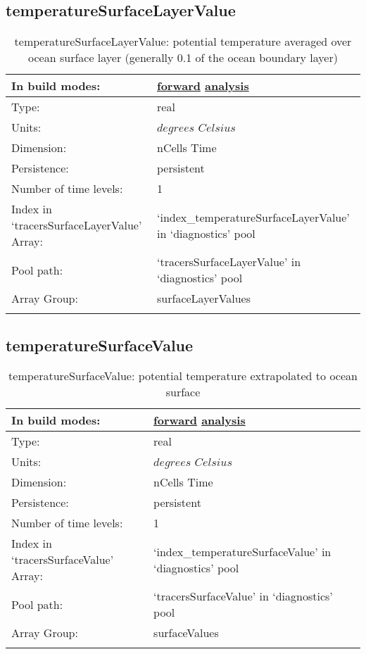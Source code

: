 \subsection[temperatureSurfaceLayerValue]{temperatureSurfaceLayerValue}
\label{subsec:var_sec_diagnostics_temperatureSurfaceLayerValue}
\begin{center}
\begin{longtable}{| p{2.0in} | p{4.0in} |}
        \hline 
        In build modes: & \hyperref[subsec:forward_var_tab_diagnostics]{forward} \hyperref[subsec:analysis_var_tab_diagnostics]{analysis} \\
        \hline 
        Type: & real \\
        \hline 
        Units: & $degrees$ $Celsius$ \\
        \hline 
        Dimension: & nCells Time \\
        \hline 
        Persistence: & persistent \\
        \hline 
        Number of time levels: & 1 \\
        \hline 
		 Index in `tracersSurfaceLayerValue' Array: & `index\_temperatureSurfaceLayerValue' in `diagnostics' pool \\
		 \hline 
            Pool path: & `tracersSurfaceLayerValue' in `diagnostics' pool \\
		 \hline 
		 Array Group: & surfaceLayerValues \\
		 \hline 
    \caption{temperatureSurfaceLayerValue: potential temperature averaged over ocean surface layer (generally 0.1 of the ocean boundary layer)}
\end{longtable}
\end{center}
\subsection[temperatureSurfaceValue]{temperatureSurfaceValue}
\label{subsec:var_sec_diagnostics_temperatureSurfaceValue}
\begin{center}
\begin{longtable}{| p{2.0in} | p{4.0in} |}
        \hline 
        In build modes: & \hyperref[subsec:forward_var_tab_diagnostics]{forward} \hyperref[subsec:analysis_var_tab_diagnostics]{analysis} \\
        \hline 
        Type: & real \\
        \hline 
        Units: & $degrees$ $Celsius$ \\
        \hline 
        Dimension: & nCells Time \\
        \hline 
        Persistence: & persistent \\
        \hline 
        Number of time levels: & 1 \\
        \hline 
		 Index in `tracersSurfaceValue' Array: & `index\_temperatureSurfaceValue' in `diagnostics' pool \\
		 \hline 
            Pool path: & `tracersSurfaceValue' in `diagnostics' pool \\
		 \hline 
		 Array Group: & surfaceValues \\
		 \hline 
    \caption{temperatureSurfaceValue: potential temperature extrapolated to ocean surface}
\end{longtable}
\end{center}

